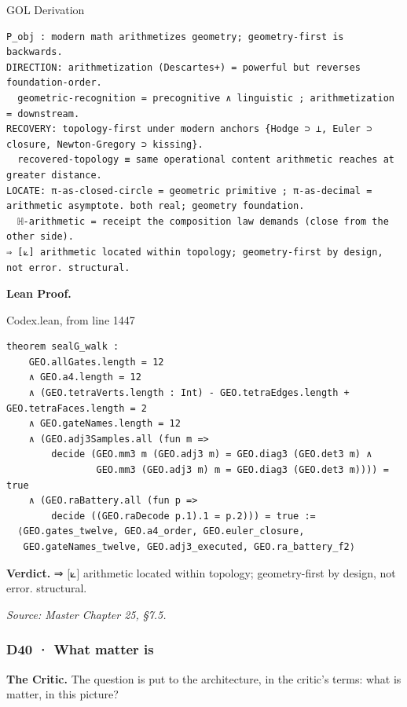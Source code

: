 \documentclass[10pt,twocolumn]{article}
\begin{document}
\begin{golbox}{GOL Derivation}
\begin{lstlisting}[style=golv]
P_obj : modern math arithmetizes geometry; geometry-first is backwards.
DIRECTION: arithmetization (Descartes+) = powerful but reverses foundation-order.
  geometric-recognition = precognitive ∧ linguistic ; arithmetization = downstream.
RECOVERY: topology-first under modern anchors {Hodge ⊃ ⊥, Euler ⊃ closure, Newton-Gregory ⊃ kissing}.
  recovered-topology ≡ same operational content arithmetic reaches at greater distance.
LOCATE: π-as-closed-circle = geometric primitive ; π-as-decimal = arithmetic asymptote. both real; geometry foundation.
  ℍ-arithmetic = receipt the composition law demands (close from the other side).
⇒ [⟀] arithmetic located within topology; geometry-first by design, not error. structural.
\end{lstlisting}
\end{golbox}

\textbf{Lean Proof.}

\begin{leanexcerpt}{Codex.lean, from line 1447}
\begin{lstlisting}[style=leanx,firstnumber=1447]
theorem sealG_walk :
    GEO.allGates.length = 12
    ∧ GEO.a4.length = 12
    ∧ (GEO.tetraVerts.length : Int) - GEO.tetraEdges.length + GEO.tetraFaces.length = 2
    ∧ GEO.gateNames.length = 12
    ∧ (GEO.adj3Samples.all (fun m =>
        decide (GEO.mm3 m (GEO.adj3 m) = GEO.diag3 (GEO.det3 m) ∧
                GEO.mm3 (GEO.adj3 m) m = GEO.diag3 (GEO.det3 m)))) = true
    ∧ (GEO.raBattery.all (fun p =>
        decide ((GEO.raDecode p.1).1 = p.2))) = true :=
  ⟨GEO.gates_twelve, GEO.a4_order, GEO.euler_closure,
   GEO.gateNames_twelve, GEO.adj3_executed, GEO.ra_battery_f2⟩
\end{lstlisting}
\end{leanexcerpt}

\textbf{Verdict.} ⇒ {[}⟀{]} arithmetic located within topology;
geometry-first by design, not error. structural.

\emph{Source: Master Chapter 25, §7.5.}

\hypertarget{d40-what-matter-is}{%
\subsubsection{D40 · What matter is}\label{d40-what-matter-is}}

\textbf{The Critic.} The question is put to the architecture, in the
critic's terms: what is matter, in this picture?
\end{document}
